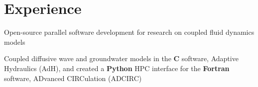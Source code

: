 \documentclass[letterpaper,10pt]{article}
\begin{document}
\strut{} %

\vspace{238.25pt}


%
%
%
%


\vspace{-2pt}
\section{Experience}
  \resumeSubHeadingListStart


        \resumeItemListStart
            {Open-source parallel software development for research on coupled
            fluid dynamics models}

            {Coupled diffusive wave and groundwater models in the \textbf{C}
            software, Adaptive Hydraulics (AdH), and created a \textbf{Python}
            HPC interface for the \textbf{Fortran} software, ADvanced
            CIRCulation (ADCIRC)}
        \resumeItemListEnd
\end{document}
